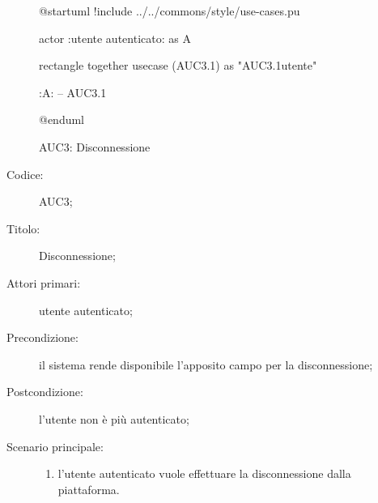 \documentclass[../../../analisi-dei-requisiti.tex]{subfiles}
\begin{document}
\begin{figure}[H]
  \centering
  \begin{plantuml}
  @startuml
  !include ../../commons/style/use-cases.pu

  actor :utente autenticato: as A

  rectangle {
    together {
      usecase (AUC3.1) as "AUC3.1\nDisconnessione utente"
    }
  }

  :A: -- AUC3.1

  @enduml
  \end{plantuml}
  \caption{AUC3: Disconnessione}%
  \label{fig:auc3}
\end{figure}

\begin{description}
  \item[Codice:] AUC3;
  \item[Titolo:] Disconnessione;
  \item[Attori primari:] utente autenticato;
  \item[Precondizione:] il sistema rende disponibile l'apposito campo per la disconnessione;
  \item[Postcondizione:] l'utente non è più autenticato;
  \item[Scenario principale:]
  \begin{enumerate}
    \item l'utente autenticato vuole effettuare la disconnessione dalla piattaforma.
  \end{enumerate}
\end{description}
\end{document}
